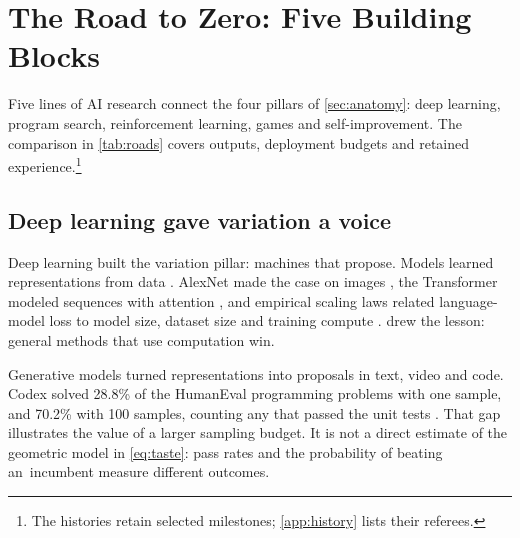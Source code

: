 
\section{The Road to Zero: Five Building Blocks}\label{sec:road}

Five lines of AI research connect the four pillars of \cref{sec:anatomy}:
deep learning, program search, reinforcement learning, games and
self-improvement. The comparison in \cref{tab:roads} covers outputs,
deployment budgets and retained experience.\footnote{The histories retain selected milestones;
\cref{app:history} lists their referees.}

\subsection{Deep learning gave variation a voice}\label{sub:road-deep}

Deep learning built the variation pillar: machines that propose. Models
learned representations from data \citep{lecun2015deep}. AlexNet
made the case on images \citep{krizhevsky2012imagenet}, the Transformer
modeled sequences with attention \citep{vaswani2017attention}, and empirical
scaling laws related language-model loss to model size, dataset size and
training compute \citep{kaplan2020scaling,hoffmann2022chinchilla}.
\citet{sutton2019bitter} drew the lesson: \mbox{general} methods that use
computation win.

Generative models turned representations into proposals in text, video
\citep{brooks2024sora} and code. Codex solved
28.8\% of the HumanEval programming problems with one sample, and 70.2\%
with 100 samples, counting any that passed the unit tests
\citep{chen2021codex}. That gap illustrates the value of a larger sampling budget. It is not
a direct estimate of the geometric model in \cref{eq:taste}: pass rates
and the probability of beating \mbox{an incumbent} measure different outcomes.

